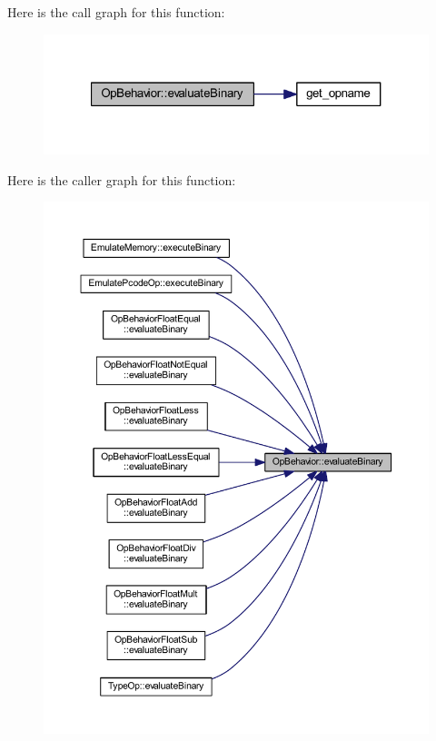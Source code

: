 Here is the call graph for this function\+:
\nopagebreak
\begin{figure}[H]
\begin{center}
\leavevmode
\includegraphics[width=321pt]{class_op_behavior_aeeed3af7aa35264b31a1f182884214a9_cgraph}
\end{center}
\end{figure}
Here is the caller graph for this function\+:
\nopagebreak
\begin{figure}[H]
\begin{center}
\leavevmode
\includegraphics[width=350pt]{class_op_behavior_aeeed3af7aa35264b31a1f182884214a9_icgraph}
\end{center}
\end{figure}
\mbox{\label{class_op_behavior_acd4f5a1c0dee0414f3c541620b88fe45}} 
